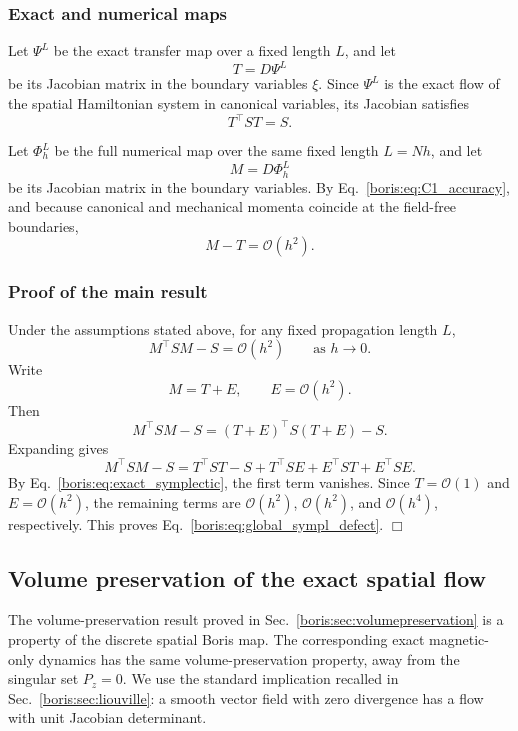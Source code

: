 \subsubsection{Exact and numerical maps}
Let \(\Psi^L\) be the exact transfer map over a fixed length \(L\), and let
\[
T = D\Psi^L
\]
be its Jacobian matrix in the boundary variables \(\xi\).
Since \(\Psi^L\) is the exact flow of the spatial Hamiltonian system in
canonical variables, its Jacobian satisfies
\begin{equation}
T^\top S T = S.
\label{boris:eq:exact_symplectic}
\end{equation}

Let \(\Phi_h^L\) be the full numerical map over the same fixed length
\(L=Nh\), and let
\[
M = D\Phi_h^L
\]
be its Jacobian matrix in the boundary variables.
By Eq.~\eqref{boris:eq:C1_accuracy}, and because canonical and mechanical momenta
coincide at the field-free boundaries,
\begin{equation}
M-T = \mathcal O(h^2).
\label{boris:eq:global_jacobian_error}
\end{equation}

\subsubsection{Proof of the main result}
Under the assumptions stated above, for any fixed propagation length \(L\),
\begin{equation}
M^\top S M - S = \mathcal O(h^2)
\qquad \text{as } h\to 0.
\label{boris:eq:global_sympl_defect}
\end{equation}
Write
\[
M = T + E,
\qquad E = \mathcal O(h^2).
\]
Then
\[
M^\top S M - S
=
(T+E)^\top S (T+E) - S.
\]
Expanding gives
\[
M^\top S M - S
=
T^\top S T - S
+ T^\top S E
+ E^\top S T
+ E^\top S E.
\]
By Eq.~\eqref{boris:eq:exact_symplectic}, the first term vanishes.
Since \(T=\mathcal O(1)\) and \(E=\mathcal O(h^2)\), the remaining terms are
\(\mathcal O(h^2)\), \(\mathcal O(h^2)\), and \(\mathcal O(h^4)\),
respectively.
This proves Eq.~\eqref{boris:eq:global_sympl_defect}. \hfill\(\Box\)

\subsection{Volume preservation of the exact spatial flow}
\label{boris:sec:exactvolume}

The volume-preservation result proved in Sec.~\ref{boris:sec:volumepreservation} is
a property of the discrete spatial Boris map.  The corresponding exact
magnetic-only dynamics has the same volume-preservation property, away from
the singular set \(P_z=0\).
We use the standard implication recalled in Sec.~\ref{boris:sec:liouville}: a
smooth vector field with zero divergence has a flow with unit Jacobian
determinant.

